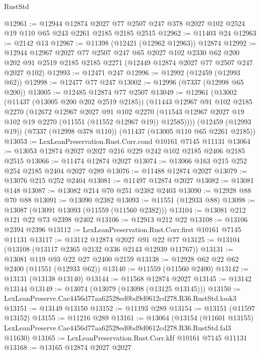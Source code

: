 \begin{lexlean}{RustStd}
\begin{coremodule}
@12961 := @12944
    @12874
    @2027
    @77
    @2507
    @247
    @378
    @2027
    @102
    @2524
    @19
    @110
    @65
    @243
    @2261
    @2185
    @2185
    @2515
@12962 := @11403 @24
@12963 := @2142 @13
@12967 := @11398 (@12421 (@12962 @12963)) @12874
@12992 := @12944
    @12967
    @2027
    @77
    @2507
    @247
    @65
    @2027
    @102
    @2330
    @62
    @200
    @202
    @91
    @2519
    @2185
    @2185
    @2271
    (@12449 @12874 @2027 @77 @2507 @247 @2027 @102)
@12993 := @12471 @247
@12996 := @12992 (@12459 (@12993 @62))
@12998 := @12477 @77 @247
@13002 := @12996 (@7337 (@12998 @65 @200))
@13005 := @12485 @12874 @77 @2507
@13049 := @12961
    (@13002
      (@11437 (@13005 @200 @202 @2519 @2185))
      (@11443
        @12967
        @91
        @102
        @2185
        @2270
        (@12672
          @12967
          @2027
          @91
          @102
          @2270
          (@11543 @12967 @2027 @19 @102 @19 @2270 (@11551 (@11552 @12967 @19)) @12585))))
    (@12459 (@12993 @19))
    (@7337 (@12998 @378 @110))
    (@11437 (@13005 @110 @65 @2261 @2185))
@13053 := LexLeanPreservation.Rust.Corr.cond @10161 @7145 @11131
@13064 := @13053 @12874 @2027 @2027 @216 @229 @242 @102 @2185 @2406 @2185 @2515
@13066 := @11474 @12874 @2027
@13074 := @13066 @163 @215 @252 @254 @2185 @2404 @2027 @289
@13076 := @11488 @12874 @2027
@13079 := @13076 @215 @252 @2404
@13081 := @11497 @12874 @2027
@13082 := @13081 @148
@13087 := @13082 @214 @70 @251 @2382 @2403
@13090 := @12928 @88 @70 @88
@13091 := @13090 @2382
@13093 := @11551 (@12933 @88)
@13098 := @13087 (@13091 @13093 (@11559 (@11560 @2382)))
@13104 := @13081 @212 @121 @22 @73 @2398 @2402
@13106 := @12913 @212 @22
@13108 := @13106 @2394 @2396
@13112 := LexLeanPreservation.Rust.Corr.first @10161 @7145 @11131
@13117 := @13112 @12874 @2027 @91 @22 @77
@13125 := @13104 (@13108 (@13117 @2365 @2132 @336 @2143 @12939 @11767))
@13131 := @13081 @119 @93 @22 @27 @2400 @2159
@13138 := @12928 @62 @22 @62 @2400 (@11551 (@12933 @62))
@13140 := @11559 (@11560 @2400)
@13142 := @13131 (@13138 @13140)
@13144 := @11568 @12874 @2027
@13145 := @13142 @13144
@13149 := @13074 (@13079 (@13098 (@13125 @13145)))
@13150 := LexLeanPreserve.Cae4456d77aa62528ed0bd9d0612cd278.R36.RustStd.look3
@13151 := @13149 @13150
@13152 := @11193 @289
@13154 := @13151 (@11597 @13152)
@13155 := @11216 @289
@13161 := @13064
    (@13154
      (@11601 @13155)
      LexLeanPreserve.Cae4456d77aa62528ed0bd9d0612cd278.R36.RustStd.fal3
      @11630)
@13165 := LexLeanPreservation.Rust.Corr.kIf @10161 @7145 @11131
@13168 := @13165 @12874 @2027 @2027

\end{coremodule}
\end{lexlean}
